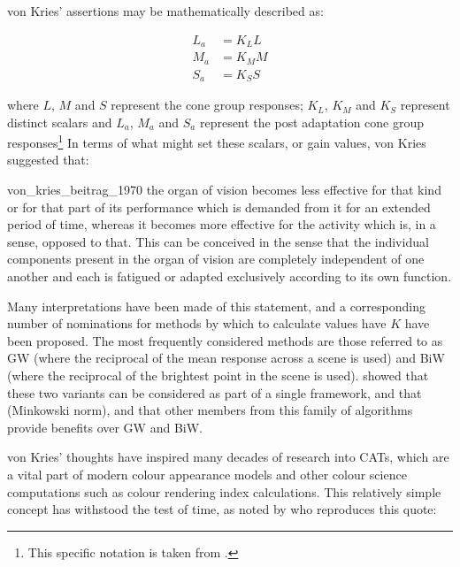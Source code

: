 von Kries' assertions may be mathematically described as:

\begin{subequations}
\begin{align}
L_{a}&=K_{L}L \\
M_{a}&=K_{M}M \\
S_{a}&=K_{S}S
\end{align}
\end{subequations}

where $L$, $M$ and $S$ represent the cone group responses; $K_{L}$, $K_{M}$ and $K_{S}$ represent distinct scalars and $L_{a}$, $M_{a}$ and $S_{a}$ represent the post adaptation cone group responses\footnote{This specific notation is taken from \citet[p. 183]{fairchild_color_2013}.} In terms of what might set these scalars, or gain values, von Kries suggested that: 

\begin{itquote}{von_kries_beitrag_1970}
the organ of vision becomes less effective for that kind or for that part of its performance which is demanded from it for an extended period of time, whereas it becomes more effective for the activity which is, in a sense, opposed to that. This can be conceived in the sense that the individual components present in the organ of vision are completely independent of one another and each is fatigued or adapted exclusively according to its own function.
\end{itquote}

Many interpretations have been made of this statement, and a corresponding number of nominations for methods by which to calculate values have $K$ have been proposed. The most frequently considered methods are those referred to as \acrfull{GW} (where the reciprocal of the mean response across a scene is used) and \acrfull{BiW} (where the reciprocal of the brightest point in the scene is used). \citet{finlayson_shades_2004} showed that these two variants can be considered as part of a single framework, and that (Minkowski norm), and that other members from this family of algorithms provide benefits over \gls{GW} and \gls{BiW}.

von Kries' thoughts have inspired many decades of research into \glspl{CAT}, which are a vital part of modern colour appearance models and other colour science computations such as colour rendering index calculations. This relatively simple concept has withstood the test of time, as noted by \citet[p. 182]{fairchild_color_2013} who reproduces this quote:

